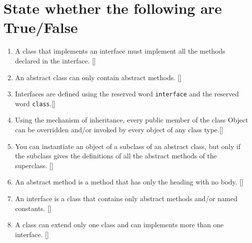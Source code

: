 \documentclass[11pt,a4paper]{article}
\begin{document}
\section*{State whether the following are True/False}
\begin{enumerate}\itemsep2pt
        \item A class that implements an interface must implement all the methods declared in the interface. [\hspace{1cm}]
        \item An abstract class can only contain abstract methods. [\hspace{1cm}]
        \item Interfaces are defined using the reserved word \texttt{interface} and the reserved word \texttt{class}.[\hspace{1cm}]
        \item Using the mechanism of inheritance, every public member of the class Object can be overridden and/or invoked by every object of any class type.[\hspace{1cm}]
	\item You can instantiate an object of a subclass of an abstract class, but only if the subclass gives the definitions of all the abstract methods of the superclass. [\hspace{1cm}]
	\item An abstract method is a method that has only the heading with no body. [\hspace{1cm}]
	\item An interface is a class that contains only abstract methods and/or named constants. [\hspace{1cm}]
	\item  A class can extend only one class and can implements more than one interface. [\hspace{1cm}]
\end{enumerate}
\end{document}
